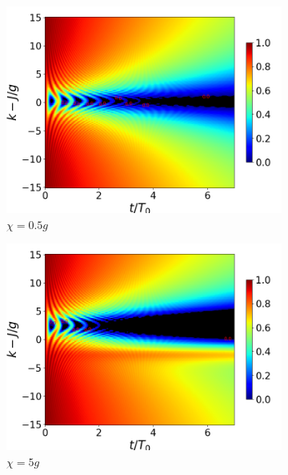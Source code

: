 \begin{figure}[h!]
    \begin{subfigure}{0.49\textwidth}
        \includegraphics[width=\textwidth]{figuras/ch4/concu/k/eg0+ge0 d=0.0g x=0.5g J=15.0g gamma=0.25g concu k dis.png}
        \caption{$\chi=0.5g$}
        \label{fig4:concu k x1}
    \end{subfigure}
    \hfill
    \begin{subfigure}{0.49\textwidth}
        \includegraphics[width=\textwidth]{figuras/ch4/concu/k/eg0+ge0 d=0.0g x=5.0g J=15.0g gamma=0.25g concu k dis.png}
        \caption{$\chi=5g$}
        \label{fig4:concu k x2}
    \end{subfigure}
    \caption{}
    \label{fig4:concu k params}
\end{figure}

